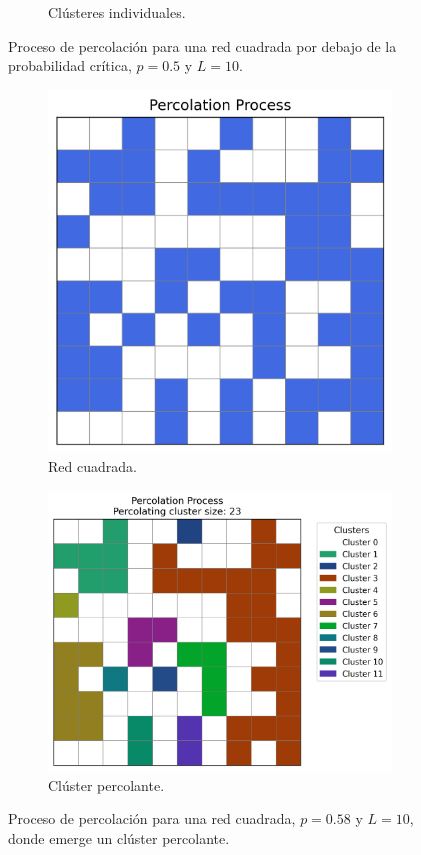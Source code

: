 \documentclass[12pt,a4paper]{article}
\begin{document}
\begin{figure}[H]
\begin{subfigure}[h]{0.45\textwidth}
        \caption{Clústeres individuales.}
        \label{fig:subfig2}
    \end{subfigure}
    \caption{Proceso de percolación para una red cuadrada por debajo de la probabilidad crítica, \( p = 0.5 \) y \( L = 10 \).}
    \label{fig:1}
\end{figure}

\begin{figure}[H]
    \centering
    \begin{subfigure}[h]{0.4\textwidth}
        \centering
        \includegraphics[width=0.75\linewidth]{../figures/percolation2.png}
        \caption{Red cuadrada.}
        \label{fig:subfig3}
    \end{subfigure}
    \hspace{0.02 cm}
    \begin{subfigure}[h]{0.45\textwidth}
        \centering
        \includegraphics[width=0.9\linewidth]{../figures/clusterpercolation2.png}
        \caption{Clúster percolante.}
        \label{fig:subfig4}
    \end{subfigure}
    \caption{Proceso de percolación para una red cuadrada, \( p = 0.58 \) y \( L = 10 \), donde emerge un clúster percolante.}
    \label{fig:2}
\end{figure}
\end{document}
